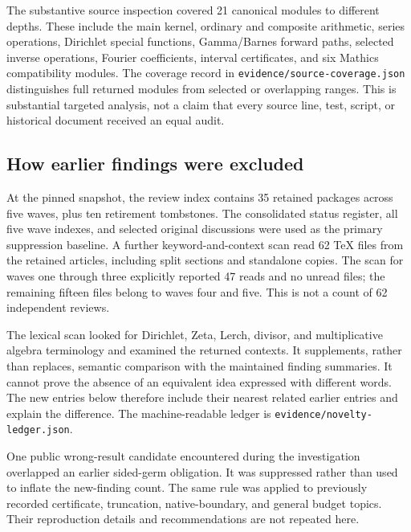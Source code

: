 \documentclass[11pt,letterpaper]{article}
\newcommand{\code}[1]{\nolinkurl{#1}}
\begin{document}
The substantive source inspection covered 21 canonical modules to different
depths. These include the main kernel, ordinary and composite arithmetic,
series operations, Dirichlet special functions, Gamma/Barnes forward paths,
selected inverse operations, Fourier coefficients, interval certificates, and
six Mathics compatibility modules. The coverage record in
\code{evidence/source-coverage.json} distinguishes full returned modules from
selected or overlapping ranges. This is substantial targeted analysis, not a
claim that every source line, test, script, or historical document received an
equal audit.

\subsection{How earlier findings were excluded}
At the pinned snapshot, the review index contains 35 retained packages across
five waves, plus ten retirement tombstones. The consolidated status register,
all five wave indexes, and selected original discussions were used as the
primary suppression baseline. A further keyword-and-context scan read 62 TeX
files from the retained articles, including split sections and standalone
copies. The scan for waves one through three explicitly reported 47 reads and
no unread files; the remaining fifteen files belong to waves four and five.
This is not a count of 62 independent reviews.~\cite{reviewindex,wave3,wave5,register}

The lexical scan looked for Dirichlet, Zeta, Lerch, divisor, and multiplicative
algebra terminology and examined the returned contexts. It supplements, rather
than replaces, semantic comparison with the maintained finding summaries. It
cannot prove the absence of an equivalent idea expressed with different words.
The new entries below therefore include their nearest related earlier entries
and explain the difference. The machine-readable ledger is
\code{evidence/novelty-ledger.json}.

One public wrong-result candidate encountered during the investigation overlapped
an earlier sided-germ obligation. It was suppressed rather than used to inflate
the new-finding count. The same rule was applied to previously recorded
certificate, truncation, native-boundary, and general budget topics. Their
reproduction details and recommendations are not repeated here.
\end{document}
